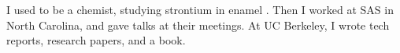 \documentclass{article}
\begin{document}
	I used to be a chemist, studying strontium in enamel
	\cite{strontiummottling,stablestrontium}. Then I worked
	at SAS in North Carolina, and gave talks at their
	meetings\cite{sugirepeated}. At UC Berkeley, I wrote
	tech reports\cite{xrandom}, research papers\cite{wic},
	and a book\cite{datamanipulation}.
	
\end{document}
